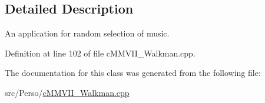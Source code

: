 \subsection{Detailed Description}
An application for random selection of music. 

Definition at line 102 of file c\+M\+M\+V\+I\+I\+\_\+\+Walkman.\+cpp.



The documentation for this class was generated from the following file\+:\begin{DoxyCompactItemize}
\item 
src/\+Perso/\hyperlink{cMMVII__Walkman_8cpp}{c\+M\+M\+V\+I\+I\+\_\+\+Walkman.\+cpp}\end{DoxyCompactItemize}
